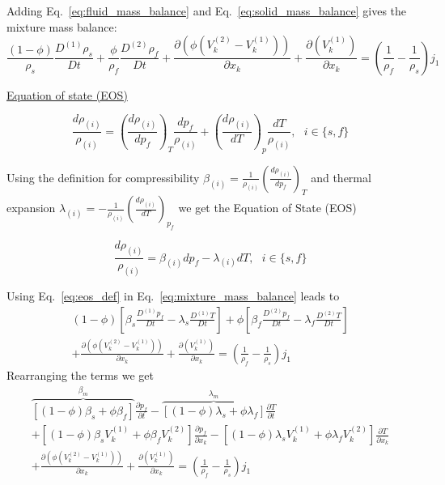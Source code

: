 \documentclass[]{scrreprt}
\begin{document}
Adding Eq.~\ref{eq:fluid_mass_balance} and Eq.~\ref{eq:solid_mass_balance} gives the mixture mass balance:
\begin{equation}
  \label{eq:mixture_mass_balance}
  \frac{(1-\phi)}{\rho_s} \frac{D^{(1)} \rho_s }{D t} +\frac{\phi}{\rho_f} \frac{D^{(2)} \rho_f }{D t} + \frac{\partial( \phi (V^{(2)}_k -V^{(1)}_k))}{\partial x_k}+ \frac{\partial(V^{(1)}_k)}{\partial x_k}  = \left(\frac{1}{\rho_f} - \frac{1}{\rho_s}\right)j_1
\end{equation}

\underline{Equation of state (EOS)}

\begin{equation}
  \label{eq:density_derivative}
  \frac{d\rho_{(i)}}{\rho_{(i)}} = \left( \frac{d\rho_{(i)}}{dp_f} \right)_T \frac{dp_f}{\rho_{(i)}} +\left( \frac{d\rho_{(i)}}{dT} \right)_p \frac{dT}{\rho_{(i)}}, \:\:\:i\in \{s,f\} 
\end{equation}

Using the definition for compressibility $\beta_{(i)}=\frac{1}{\rho_{(i)}}\left( \frac{d\rho_{(i)}}{dp_f} \right)_T$ and thermal expansion $\lambda_{(i)}=-\frac{1}{\rho_{(i)}}\left( \frac{d\rho_{(i)}}{dT} \right)_{p_f}$ we get the Equation of State (EOS)

\begin{equation}
  \label{eq:eos_def}
  \frac{d\rho_{(i)}}{\rho_{(i)}} = \beta_{(i)} dp_f - \lambda_{(i)} dT, \:\:\:i\in \{s,f\} 
\end{equation}

Using Eq.~\ref{eq:eos_def} in Eq.~\ref{eq:mixture_mass_balance} leads to
\begin{multline}
  \label{eq:mixture_mass_balance2}
  (1-\phi) \left[ \beta_s \frac{D^{(1)}p_f}{Dt} - \lambda_s\frac{D^{(1)}T}{Dt}  \right] + \phi \left[ \beta_f \frac{D^{(2)}p_f}{Dt} - \lambda_f\frac{D^{(2)}T}{Dt}  \right] \\
  + \frac{\partial( \phi (V^{(2)}_k -V^{(1)}_k))}{\partial x_k}+ \frac{\partial(V^{(1)}_k)}{\partial x_k}  = \left(\frac{1}{\rho_f} - \frac{1}{\rho_s}\right)j_1
\end{multline}
Rearranging the terms we get
\begin{multline}
  \label{eq:mixture_mass_balance3}
  \overbrace{\left[(1-\phi)\beta_s + \phi\beta_f\right]}^{\beta_m}  \frac{\partial p_f}{\partial t} 
  - \overbrace{\left[(1-\phi)\lambda_s + \phi\lambda_f\right]}^{\lambda_m} \frac{\partial T}{\partial t} \\
  + \left[(1-\phi)\beta_s V^{(1)}_k + \phi\beta_f V^{(2)}_k \right] \frac{\partial p_f}{\partial x_k} 
  - \left[(1-\phi)\lambda_s V^{(1)}_k + \phi\lambda_f V^{(2)}_k \right] \frac{\partial T}{\partial x_k} \\
  + \frac{\partial( \phi (V^{(2)}_k -V^{(1)}_k))}{\partial x_k}+ \frac{\partial(V^{(1)}_k)}{\partial x_k}  = \left(\frac{1}{\rho_f} - \frac{1}{\rho_s}\right)j_1
\end{multline}
\end{document}
